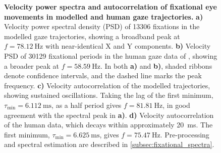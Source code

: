 \begin{figure}[htbp]
    \centering
	\begin{subfigure}[T]{0.48\textwidth}
		\centering 
	\end{subfigure}
    \hfill
	\begin{subfigure}[T]{0.48\textwidth}
		\centering
	\end{subfigure}
    \begin{subfigure}[T]{0.48\textwidth}
		\centering 
	\end{subfigure}
    \hfill
	\begin{subfigure}[T]{0.48\textwidth}
		\centering
	\end{subfigure}
    \caption{\textbf{Velocity power spectra and autocorrelation of fixational eye movements in modelled and human gaze trajectories.} \textbf{a)} Velocity power spectral density (PSD) of 13306 fixations in the modelled gaze trajectories, showing a broadband peak at $f=\qty{78.12}{\hertz}$ with near-identical X and Y components. \textbf{b)} Velocity PSD of 30129 fixational periods in the human gaze data of \cite{naher_primate_saccades}, showing a broader peak at $f=\qty{58.59}{\hertz}$. In both \textbf{a)} and \textbf{b)}, shaded ribbons denote confidence intervals, and the dashed line marks the peak frequency. \textbf{c)} Velocity autocorrelation of the modelled trajectories, showing sustained oscillations. Taking the lag of the first minimum, $\tau_{\min}=\qty{6.112}{\milli\second}$, as a half period gives $f=\qty{81.81}{\hertz}$, in good agreement with the spectral peak in \textbf{a)}. \textbf{d)} Velocity autocorrelation of the human data, which decays within approximately \qty{20}{\milli\second}. The first minimum, $\tau_{\min}=\qty{6.625}{\milli\second}$, gives $f=\qty{75.47}{\hertz}$. Pre-processing and spectral estimation are described in \cref{subsec:fixational_spectra}.}
    \label{fig:fixation_psd}
\end{figure}
